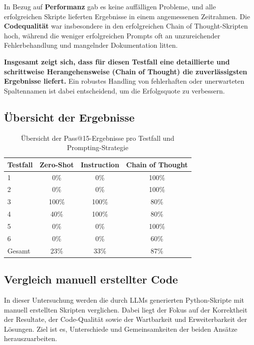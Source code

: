 \documentclass[11pt,a4paper]{article}
\begin{document}
In Bezug auf \textbf{Performanz} gab es keine auffälligen Probleme, und alle erfolgreichen Skripte lieferten Ergebnisse in einem angemessenen Zeitrahmen. Die \textbf{Codequalität} war insbesondere in den erfolgreichen Chain of Thought-Skripten hoch, während die weniger erfolgreichen Prompts oft an unzureichender Fehlerbehandlung und mangelnder Dokumentation litten.

\textbf{Insgesamt zeigt sich, dass für diesen Testfall eine detaillierte und schrittweise Herangehensweise (Chain of Thought) die zuverlässigsten Ergebnisse liefert.} Ein robustes Handling von fehlerhaften oder unerwarteten Spaltennamen ist dabei entscheidend, um die Erfolgsquote zu verbessern.


\subsection{Übersicht der Ergebnisse}
\begin{table}[h!]
    \centering
    \caption{Übersicht der Pass@15-Ergebnisse pro Testfall und Prompting-Strategie}
    \label{tab:pass15}
    \begin{tabular}{|l|c|c|c|}
    \hline
    \textbf{Testfall} & \textbf{Zero-Shot} & \textbf{Instruction} & \textbf{Chain of Thought} \\
    \hline
    1 & 0\% & 0\% & 100\% \\
    \hline
    2 & 0\% & 0\% & 100\% \\
    \hline
    3 & 100\% & 100\% & 80\% \\
    \hline
    4 & 40\% & 100\% & 80\% \\
    \hline
    5 & 0\% & 0\% & 100\% \\
    \hline
    6 & 0\% & 0\% & 60\% \\
    \hline
    Gesamt & 23\% & 33\% & 87\% \\
    \hline
    \end{tabular}
\end{table}

\subsection{Vergleich manuell erstellter Code}
\label{sec:vergleich_manuell_llm}
In dieser Untersuchung werden die durch LLMs generierten Python-Skripte mit manuell erstellten Skripten verglichen. Dabei liegt der Fokus auf der Korrektheit der Resultate, der Code-Qualität sowie der Wartbarkeit und Erweiterbarkeit der Lösungen. Ziel ist es, Unterschiede und Gemeinsamkeiten der beiden Ansätze herauszuarbeiten.
\end{document}
